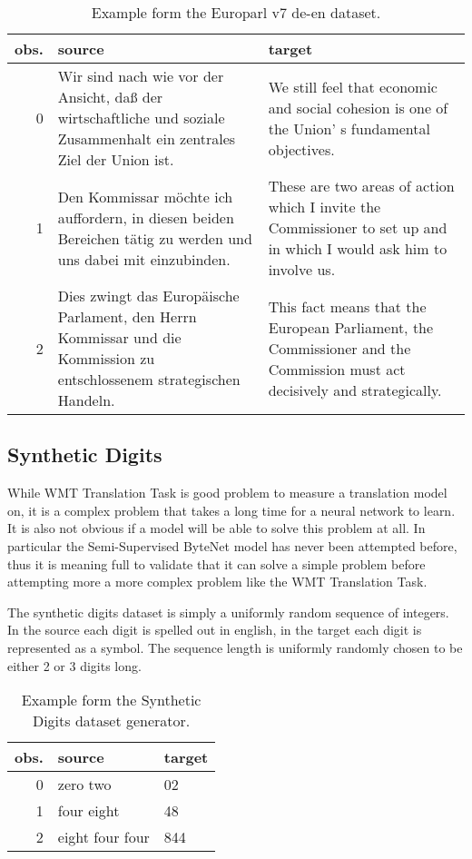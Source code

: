 \begin{table}[H]
\centering
\begin{tabular}{r|p{5cm} p{5cm}}
	obs. & source & target\\ \hline
        0 & Wir sind nach wie vor der Ansicht, daß der wirtschaftliche und soziale Zusammenhalt ein zentrales Ziel der Union ist. & We still feel that economic and social cohesion is one of the Union' s fundamental objectives. \\
        1 & Den Kommissar möchte ich auffordern, in diesen beiden Bereichen tätig zu werden und uns dabei mit einzubinden. & These are two areas of action which I invite the Commissioner to set up and in which I would ask him to involve us. \\
        2  & Dies zwingt das Europäische Parlament, den Herrn Kommissar und die Kommission zu entschlossenem strategischen Handeln. & This fact means that the European Parliament, the Commissioner and the Commission must act decisively and strategically.
\end{tabular}
\caption{Example form the Europarl v7 de-en dataset.}
\end{table}

\subsection{Synthetic Digits}

While WMT Translation Task is good problem to measure a translation model on, it is a complex problem that takes a long time for a neural network to learn. It is also not obvious if a model will be able to solve this problem at all. In particular the Semi-Supervised ByteNet model has never been attempted before, thus it is meaning full to validate that it can solve a simple problem before attempting more a more complex problem like the WMT Translation Task.

The synthetic digits dataset is simply a uniformly random sequence of integers. In the source each digit is spelled out in english, in the target each digit is represented as a symbol. The sequence length is uniformly randomly chosen to be either 2 or 3 digits long.
\begin{table}[H]
\centering
\begin{tabular}{r|p{5cm} p{5cm}}
	obs. & source & target\\ \hline
	0 & zero two & 02 \\
    1 & four eight & 48 \\
    2 & eight four four & 844
\end{tabular}
\caption{Example form the Synthetic Digits dataset generator.}
\end{table}
